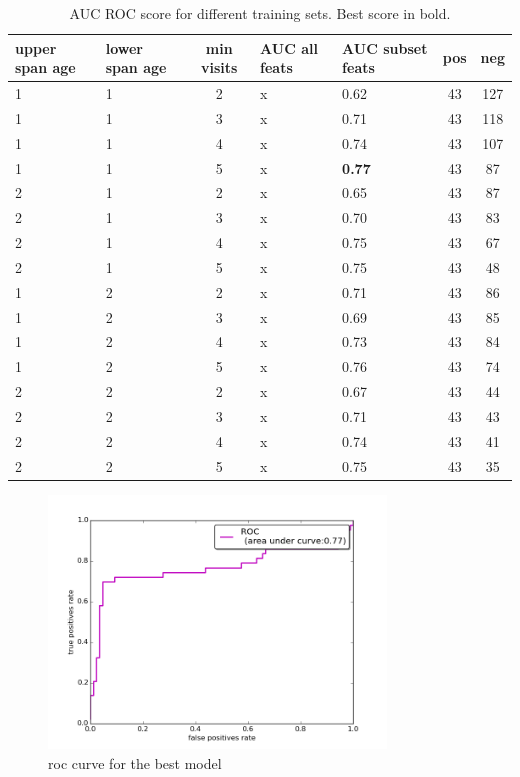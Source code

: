 \begin{table}[!h]
	\centering
	\begin{tabular}{C{1.5cm}  C{1.5cm}  c | C{2cm}  C{2cm} |  c  c}
		upper span age & lower span age & min visits & AUC all feats & AUC subset feats& pos & neg\\
		 & 1 & 2  & x & 0.62 & 43 & 127\\
		1 & 1 & 3  & x & 0.71 & 43 & 118\\
		1 & 1 & 4  & x & 0.74 & 43 & 107\\
		1 & 1 & 5  & x & \textbf{0.77} & 43 & 87\\
		2 & 1 & 2  & x & 0.65 & 43 & 87\\
		2 & 1 & 3  & x & 0.70 & 43 & 83\\
		2 & 1 & 4  & x & 0.75 & 43 & 67\\
		2 & 1 & 5  & x & 0.75 & 43 & 48\\
		1 & 2 & 2  & x & 0.71 & 43 & 86\\
		1 & 2 & 3  & x & 0.69 & 43 & 85\\
		1 & 2 & 4  & x & 0.73 & 43 & 84\\
		1 & 2 & 5  & x & 0.76 & 43 & 74\\
		2 & 2 & 2  & x & 0.67 & 43 & 44\\
		2 & 2 & 3  & x & 0.71 & 43 & 43\\
		2 & 2 & 4  & x & 0.74 & 43 & 41\\
		2 & 2 & 5  & x & 0.75 & 43 & 35\\
		
	\end{tabular}
	\caption{AUC ROC score for different training sets. Best score in bold.}
	\label{table:exp_res}
\end{table}


\begin{figure}[h]
	\centering
	\includegraphics[width= 0.8\textwidth]{chapter4/roc.png}
	\caption{roc curve for the best model}
	\label{fig:roc_best}
\end{figure}

